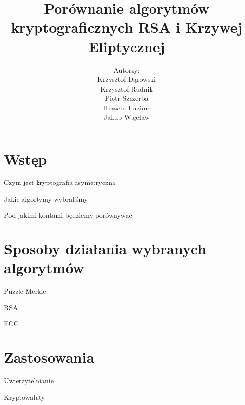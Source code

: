 \documentclass{beamer}
\title{Porównanie algorytmów kryptograficznych RSA i Krzywej Eliptycznej}
\author{Autorzy:\\ Krzysztof Dąrowski\\ Krzysztof Rudnik\\ Piotr Szczerba\\ Hussein Hazime\\ Jakub Więcław}
\date{}
\begin{document}
\begin{frame}
    \titlepage
\end{frame}

\section{Wstęp}
\begin{frame}{Czym jest kryptografia asymetryczna}
\end{frame}

\begin{frame}{Jakie algortymy wybraliśmy}
    
\end{frame}
\begin{frame}{Pod jakimi kontami będziemy porównywać}
    
\end{frame}

\section{Sposoby działania wybranych algorytmów}
\begin{frame}{Puzzle Merkle} %
    
\end{frame}


\begin{frame}{RSA}
    
\end{frame}



\begin{frame}{ECC}
    
\end{frame}


\section{Zastosowania}

\begin{frame}{Uwierzytelnianie}
\end{frame}


\begin{frame}{Kryptowaluty}
    
\end{frame}
\end{document}

